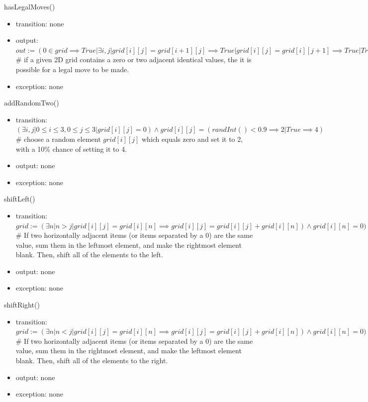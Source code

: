 \documentclass[12pt]{article}
\begin{document}
\noindent hasLegalMoves()
\begin{itemize}
    \item transition: none
    \item output: $out := (0 \in grid \implies True| \exists i,j | grid[i][j] = grid[i+1][j] \implies True | grid[i][j] = grid[i][j+1] \implies True| True \implies False)$ \\
    \# if a given 2D grid contains a zero or two adjacent identical values, the it is possible for a legal move to be made.
    \item exception: none
\end{itemize}

\noindent addRandomTwo()
\begin{itemize}
    \item transition: $(\exists i,j | 0 \leq i \leq 3,0 \leq j \leq 3 | grid[i][j] = 0) \land grid[i][j] = (randInt() < 0.9 \implies 2 | True \implies 4)$ \\
    \# choose a random element $grid[i][j]$ which equals zero and set it to 2, with a 10\% chance of setting it to 4.
    \item output: none
    \item exception: none
\end{itemize}

\noindent shiftLeft()
\begin{itemize}
    \item transition: $grid := (\exists n | n > j|grid[i][j] = grid[i][n] \implies grid[i][j] = grid[i][j]+grid[i][n]) \land grid[i][n] = 0) \land (\exists m | m > j| grid[i][j] = 0 \land grid[i][m] \neq 0 \implies grid[i][j],grid[i][m] = grid[i][m],grid[i][j])$ \\
    \# If two horizontally adjacent items (or items separated by a 0) are the same value, sum them in the leftmost element, and make the rightmost element blank. Then, shift all of the elements to the left.
    \item output: none
    \item exception: none
\end{itemize}

\noindent shiftRight()
\begin{itemize}
    \item transition: $grid := (\exists n | n < j|grid[i][j] = grid[i][n] \implies grid[i][j] = grid[i][j]+grid[i][n]) \land grid[i][n] = 0) \land (\exists m | m < j| grid[i][j] = 0 \land grid[i][m] \neq 0 \implies grid[i][j],grid[i][m] = grid[i][m],grid[i][j])$ \\
    \# If two horizontally adjacent items (or items separated by a 0) are the same value, sum them in the rightmost element, and make the leftmost element blank. Then, shift all of the elements to the right.
    \item output: none
    \item exception: none
\end{itemize}
\end{document}
